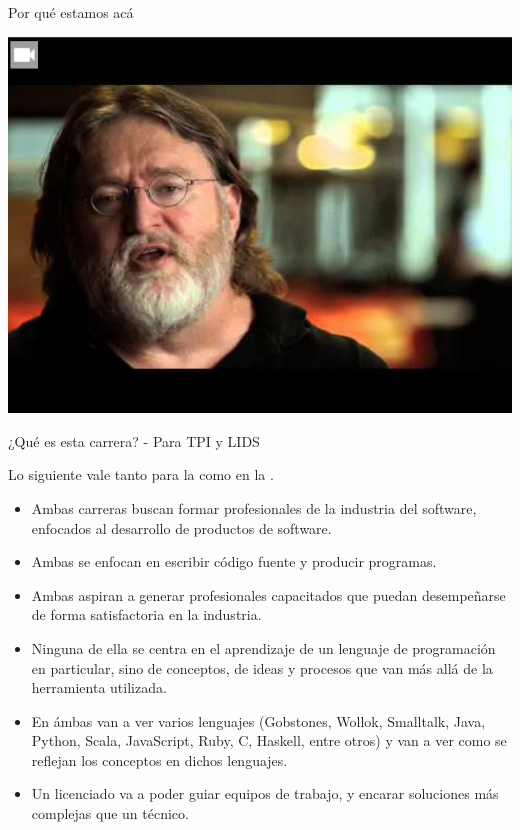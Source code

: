 \begin{frame}{Por qué estamos acá}
	\centerline{\href{https://www.youtube.com/watch?v=bKm-0VdTwA8}{\includegraphics[scale=0.4]{img/why.png}}}
	\centerline{}
\end{frame}


\begin{frame}{¿Qué es esta carrera? - Para TPI y LIDS}
  \small{
  Lo siguiente vale tanto para la  como en la .
  \begin{itemize}
    \item Ambas carreras buscan formar profesionales de la industria del software,
      enfocados al desarrollo de productos de software.
    \item Ambas se enfocan en escribir código fuente y producir programas.
    \item Ambas aspiran a generar profesionales capacitados que puedan desempeñarse de
      forma satisfactoria en la industria.
    \item Ninguna de ella se centra en el aprendizaje de un lenguaje de programación en
      particular, sino de conceptos, de ideas y procesos que van más allá de la
      herramienta utilizada.
    \item En ámbas van a ver varios lenguajes (Gobstones, Wollok, Smalltalk, Java,
      Python, Scala, JavaScript, Ruby, C, Haskell, entre otros) y van a ver como se
      reflejan los conceptos en dichos lenguajes.
    \item Un licenciado va a poder guiar equipos de trabajo, y encarar soluciones
      más complejas que un técnico.
  \end{itemize}
  }
\end{frame}

